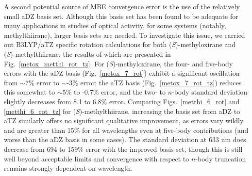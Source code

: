         A second potential source of MBE convergence error is the use of the relatively small aDZ basis set. Although this basis set has been found to be adequate for many applications in studies of optical activity, for some systems (notably, methylthiirane), larger basis sets are needed.\cite{Mach11,Howard2018a}  To investigate this issue, we carried out B3LYP/aTZ specific rotation calculations for both (\textit{S})-methyloxirane and (\textit{S})-methylthiirane, the results of which are presented in Fig.\ \ref{metox_metthi_rot_tz}.  For (\textit{S})-methyloxirane, the four- and five-body errors with the aDZ basis (Fig.\ \ref{metox_7_rot}) exhibit a significant oscillation from $\sim$7\% error to $\sim$-3\% error; the aTZ basis (Fig.\ \ref{metox_7_rot_tz}) reduces this somewhat to $\sim$5\% to -0.7\% error, and the two- to $n$-body standard deviation slightly decreases from 8.1 to 6.8\% error. Comparing Figs.\ \ref{metthi_6_rot} and \ref{metthi_6_rot_tz} for (\textit{S})-methylthiirane, increasing the basis set from aDZ to aTZ similarly offers no significant qualitative improvement, as errors vary wildly and are greater than 15\% for all wavelengths even at five-body contributions (and worse than the aDZ basis in some cases). The standard deviation at 633 nm does decrease from 694 to 159\% error with the improved basis set, though this is still well beyond acceptable limits and convergence with respect to $n$-body truncation remains strongly dependent on wavelength.
